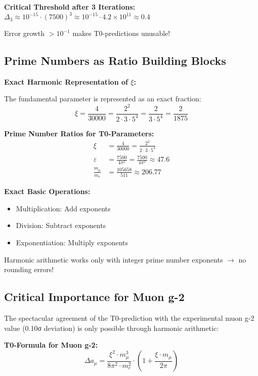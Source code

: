 \documentclass[12pt,a4paper]{report}
\newcommand{\xipar}{\xi}      %
\begin{document}
\textbf{Critical Threshold after 3 Iterations:}
$\Delta_3 \approx 10^{-15} \cdot (7500)^3 \approx 10^{-15} \cdot 4.2 \times 10^{11} \approx 0.4$

Error growth $> 10^{-1}$ makes T0-predictions unusable!

\subsection{Prime Numbers as Ratio Building Blocks}\label{subsec:prime_ratios}

\textbf{Exact Harmonic Representation of $\xipar$:}

The fundamental parameter is represented as an exact fraction:
\begin{equation}
	\xipar = \frac{4}{30000} = \frac{2^2}{2 \cdot 3 \cdot 5^4} = \frac{2}{3 \cdot 5^4} = \frac{2}{1875}
\end{equation}

\textbf{Prime Number Ratios for T0-Parameters:}
\begin{align}
	\xipar &= \frac{4}{30000} = \frac{2^2}{2 \cdot 3 \cdot 5^4} \\
	\varepsilon &= \frac{7500}{4\pi^2} = \frac{7500}{4\pi^2} \approx 47.6 \\
	\frac{m_\mu}{m_e} &= \frac{105658}{511} \approx 206.77
\end{align}

\textbf{Exact Basic Operations:}
\begin{itemize}
	\item Multiplication: Add exponents
	\item Division: Subtract exponents
	\item Exponentiation: Multiply exponents
\end{itemize}

Harmonic arithmetic works only with integer prime number exponents $\rightarrow$ no rounding errors!

\subsection{Critical Importance for Muon g-2}\label{subsec:harmonic_muon_g2}

The spectacular agreement of the T0-prediction with the experimental muon g-2 value (0.10σ deviation) is only possible through harmonic arithmetic:

\textbf{T0-Formula for Muon g-2:}
\begin{equation}
	\Delta a_\mu = \frac{\xipar^2 \cdot m_\mu^3}{8\pi^2 \cdot m_e^2} \cdot \left(1 + \frac{\xipar \cdot m_\mu}{2\pi}\right)
\end{equation}
\end{document}

